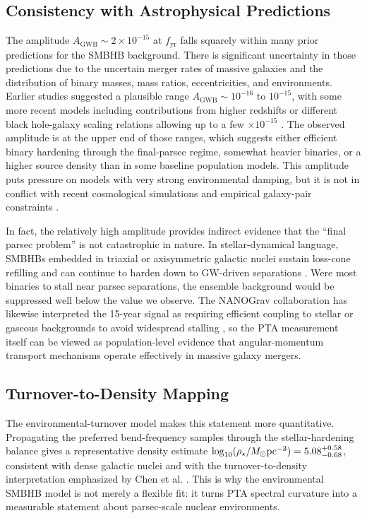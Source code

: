 \documentclass[symmetry,article,submit,pdftex,moreauthors]{Definitions/mdpi}
\begin{document}
\subsection{Consistency with Astrophysical Predictions}
The amplitude $A_{\mathrm{GWB}}\sim2\times10^{-15}$ at $f_{\mathrm{yr}}$ falls squarely within many prior predictions for the SMBHB background. There is significant uncertainty in those predictions due to the uncertain merger rates of massive galaxies and the distribution of binary masses, mass ratios, eccentricities, and environments. Earlier studies \cite{Sesana2013} suggested a plausible range $A_{\mathrm{GWB}}\sim10^{-16}$ to $10^{-15}$, with some more recent models including contributions from higher redshifts or different black hole-galaxy scaling relations allowing up to a few $\times10^{-15}$ \cite{Kelley2017}. The observed amplitude is at the upper end of those ranges, which suggests either efficient binary hardening through the final-parsec regime, somewhat heavier binaries, or a higher source density than in some baseline population models. This amplitude puts pressure on models with very strong environmental damping, but it is not in conflict with recent cosmological simulations and empirical galaxy-pair constraints \cite{Kelley2017}.

In fact, the relatively high amplitude provides indirect evidence that the ``final parsec problem'' is not catastrophic in nature. In stellar-dynamical language, SMBHBs embedded in triaxial or axisymmetric galactic nuclei sustain loss-cone refilling and can continue to harden down to GW-driven separations \cite{Colpi2014,Khan2013}. Were most binaries to stall near parsec separations, the ensemble background would be suppressed well below the value we observe. The NANOGrav collaboration has likewise interpreted the 15-year signal as requiring efficient coupling to stellar or gaseous backgrounds to avoid widespread stalling \cite{NANOGrav15-NewPhys}, so the PTA measurement itself can be viewed as population-level evidence that angular-momentum transport mechanisms operate effectively in massive galaxy mergers.

\subsection{Turnover-to-Density Mapping}\label{subsec:density_mapping}
The environmental-turnover model makes this statement more quantitative. Propagating the preferred bend-frequency samples through the stellar-hardening balance gives a representative density estimate $\log_{10}(\rho_\star/M_\odot{\rm pc}^{-3})=5.08^{+0.58}_{-0.68}$, consistent with dense galactic nuclei and with the turnover-to-density interpretation emphasized by Chen et al. \cite{ChenTomography2024}. This is why the environmental SMBHB model is not merely a flexible fit: it turns PTA spectral curvature into a measurable statement about parsec-scale nuclear environments.
\end{document}

